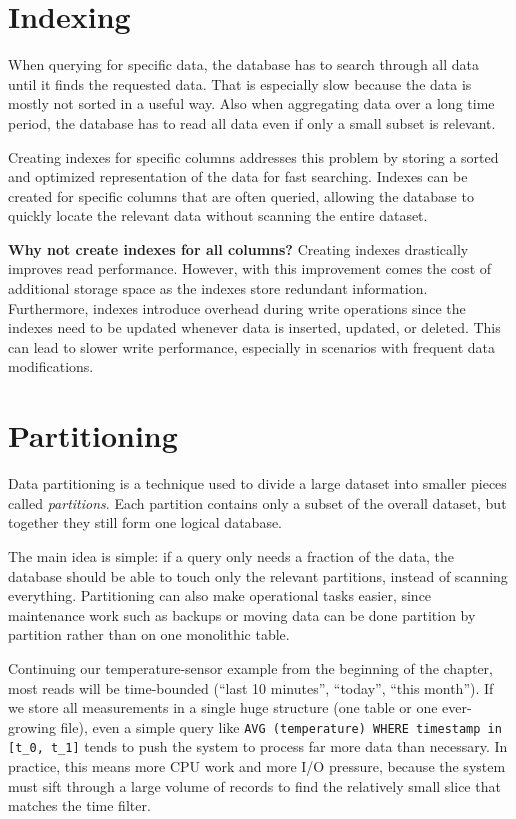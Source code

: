 \section{Indexing}

When querying for specific data, the database has to search through all data
until it finds the requested data. That is especially slow because the data is
mostly not sorted in a useful way. Also when aggregating data over a long time
period, the database has to read all data even if only a small subset is
relevant.

Creating indexes for specific columns addresses this problem by storing a
sorted and optimized representation of the data for fast searching. Indexes can
be created for specific columns that are often queried, allowing the database
to quickly locate the relevant data without scanning the entire dataset.

\textbf{Why not create indexes for all columns?} Creating indexes drastically improves read performance. However, with this improvement comes the cost of additional storage space as the indexes store redundant information. Furthermore, indexes introduce overhead during write operations since the indexes need to be updated whenever data is inserted, updated, or deleted. This can lead to slower write performance, especially in scenarios with frequent data modifications.

\section{Partitioning}

Data partitioning is a technique used to divide a large dataset into smaller
pieces called \textit{partitions}. Each partition contains only a subset of the
overall dataset, but together they still form one logical
database.\cite{TigerData:01}

The main idea is simple: if a query only needs a fraction of the data, the
database should be able to touch only the relevant partitions, instead of
scanning everything. Partitioning can also make operational tasks easier, since
maintenance work such as backups or moving data can be done partition by
partition rather than on one monolithic table.\cite{TigerData:01}

Continuing our temperature-sensor example from the beginning of the chapter,
most reads will be time-bounded (``last 10 minutes'', ``today'', ``this
month''). If we store all measurements in a single huge structure (one table or
one ever-growing file), even a simple query like \texttt{AVG (temperature)
  WHERE timestamp in [t\_0, t\_1]} tends to push the system to process far more
data than necessary. In practice, this means more CPU work and more I/O
pressure, because the system must sift through a large volume of records to
find the relatively small slice that matches the time filter.

